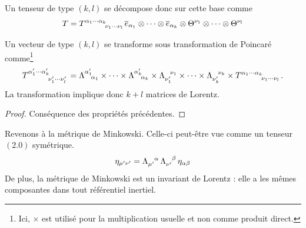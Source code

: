 Un tenseur de type $(k,l)$ se décompose donc sur cette base comme
\begin{equation}
    T = T\indices{^{\alpha _1 \cdots \alpha _k}_{\nu_1 \cdots \nu_l}}\overline{e}_{\alpha_1} \otimes \cdots \otimes \overline{e}_{\alpha_k} \otimes \Theta^{\nu_1}\otimes \cdots \otimes \Theta^{\nu_l}
\end{equation}
\begin{theoremframe}
    \begin{propri}
        Un vecteur de type $(k,l)$ se transforme sous transformation de Poincaré comme\footnote{Ici, $\times$ est utilisé pour la multiplication usuelle et non comme produit direct.}
        \begin{equation}
            T\indices{^{{\alpha}_1' \cdots {\alpha}_k'}_{{\nu_1'} \cdots {\nu_l'}}} = \Lambda\indices{^{\alpha_1'}_{\!\alpha _1 }} \times \cdots \times \Lambda\indices{^{\alpha_k'}_{\!\alpha_k}} \times \Lambda\indices{_{\nu_1' }^{\!\nu_1 }} \times \cdots \times \Lambda\indices{_{\nu_k'}^{\!\nu_k}} \times T\indices{^{\alpha _1 \cdots \alpha _k}_{\nu_1 \cdots \nu_l}}.
        \end{equation}
        La transformation implique donc $k+l$ matrices de Lorentz.
    \end{propri}
\end{theoremframe}
\begin{proof}
    Conséquence des propriétés précédentes.
\end{proof}

Revenons à la métrique de Minkowski. Celle-ci peut-être vue comme un tenseur $(2.0)$ symétrique.
{
\renewcommand\indexmarker{\cdot}
\begin{equation*}
    \eta_{\mu'\nu'} = \Lambda\indices{_{\mu'}^{\alpha}}\, \Lambda\indices{_{\nu'}^{\beta}}\,\eta_{\alpha \beta}
\end{equation*}
}
De plus, la métrique de Minkowski est un invariant de Lorentz : elle a les mêmes composantes dans tout référentiel inertiel.

